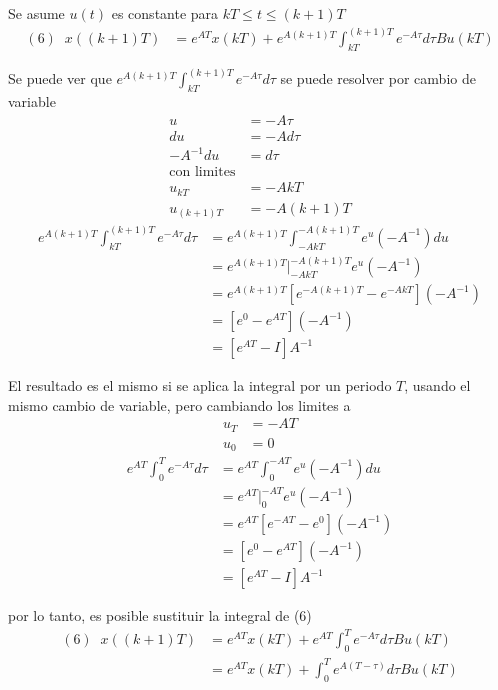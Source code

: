 Se asume \( u(t) \) es constante para \( kT \leq t \leq (k+1)T \)
\[
    \begin{split}
        (6) \;\; x((k+1)T) & = e^{AT}x(kT) + e^{A(k+1)T}\int_{kT}^{(k+1)T}e^{-A \tau}d\tau Bu(kT)  
    \end{split}
\]

Se puede ver que \( e^{A(k+1)T} \int_{kT}^{(k+1)T} e^{-A\tau} d\tau \) se puede resolver por cambio de variable 
\[
    \begin{split}
        u & = -A\tau \\
        du & = -Ad\tau \\
        -A^{-1}du & = d\tau \\
        \text{con limites} \\
        u_{kT} & = -AkT \\
        u_{(k+1)T} & = -A(k+1)T
    \end{split}
\]
\[
    \begin{split}
        e^{A(k+1)T} \int_{kT}^{(k+1)T} e^{-A\tau} d\tau & = e^{A(k+1)T} \int_{-AkT}^{-A(k+1)T} e^{u}(-A^{-1})du \\
        & = e^{A(k+1)T} \big|_{-AkT}^{-A(k+1)T} e^{u}(-A^{-1}) \\
        & = e^{A(k+1)T} [e^{-A(k+1)T} - e^{-AkT}] (-A^{-1}) \\
        & = [e^{0} - e^{AT}](-A^{-1}) \\
        & = [e^{AT} - I]A^{-1}
    \end{split}
\]

El resultado es el mismo si se aplica la integral por un periodo \( T \), usando el mismo cambio de variable, pero cambiando los limites a 
\[
    \begin{split}
        u_{T} & = -AT \\
        u_{0} & = 0
    \end{split}
\]
\[
    \begin{split}
        e^{AT} \int_{0}^{T} e^{-A\tau} d\tau & = e^{AT} \int_{0}^{-AT} e^{u}(-A^{-1})du \\
        & = e^{AT} \big|_{0}^{-AT} e^{u}(-A^{-1}) \\
        & = e^{AT} [e^{-AT} - e^{0}] (-A^{-1}) \\
        & = [e^{0} - e^{AT}](-A^{-1}) \\
        & = [e^{AT} - I]A^{-1}
    \end{split}
\]

por lo tanto, es posible sustituir la integral de (6)
\[
    \begin{split}
        (6) \;\; x((k+1)T) & = e^{AT}x(kT) + e^{AT} \int_{0}^{T} e^{-A\tau} d\tau Bu(kT) \\
        & = e^{AT}x(kT) + \int_{0}^{T} e^{A(T-\tau)} d\tau Bu(kT)
    \end{split}
\]

